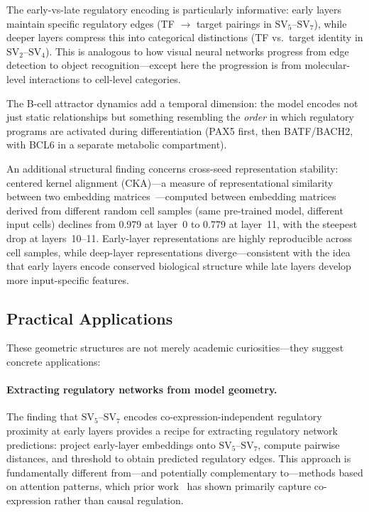 \documentclass[10pt,twocolumn]{article}
\newcommand{\SV}[1]{\mathrm{SV}_{#1}}
\begin{document}
The early-vs-late regulatory encoding is particularly informative: early layers maintain specific regulatory edges (TF $\to$ target pairings in $\SV{5}$--$\SV{7}$), while deeper layers compress this into categorical distinctions (TF vs.\ target identity in $\SV{2}$--$\SV{4}$).
This is analogous to how visual neural networks progress from edge detection to object recognition---except here the progression is from molecular-level interactions to cell-level categories.

The B-cell attractor dynamics add a temporal dimension: the model encodes not just static relationships but something resembling the \emph{order} in which regulatory programs are activated during differentiation (PAX5 first, then BATF/BACH2, with BCL6 in a separate metabolic compartment).

An additional structural finding concerns cross-seed representation stability: centered kernel alignment (CKA)---a measure of representational similarity between two embedding matrices~\citep{kornblith2019similarity}---computed between embedding matrices derived from different random cell samples (same pre-trained model, different input cells) declines from 0.979 at layer~0 to 0.779 at layer~11, with the steepest drop at layers~10--11.
Early-layer representations are highly reproducible across cell samples, while deep-layer representations diverge---consistent with the idea that early layers encode conserved biological structure while late layers develop more input-specific features.

\subsection{Practical Applications}
\label{sec:applications}

These geometric structures are not merely academic curiosities---they suggest concrete applications:

\paragraph{Extracting regulatory networks from model geometry.}
The finding that $\SV{5}$--$\SV{7}$ encodes co-expression-independent regulatory proximity at early layers provides a recipe for extracting regulatory network predictions: project early-layer embeddings onto $\SV{5}$--$\SV{7}$, compute pairwise distances, and threshold to obtain predicted regulatory edges.
This approach is fundamentally different from---and potentially complementary to---methods based on attention patterns, which prior work~\citep{kendiukhov2025attention} has shown primarily capture co-expression rather than causal regulation.
\end{document}
